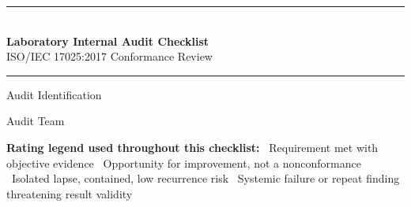 \begin{center}
{\color{auditnavy}\rule{\linewidth}{1.4pt}}\\[6pt]
{\Huge\bfseries\color{auditnavy} Laboratory Internal Audit Checklist}\\[4pt]
{\large\color{auditteal} ISO/IEC 17025:2017 Conformance Review}\\[6pt]
{\color{auditnavy}\rule{\linewidth}{1.4pt}}
\end{center}

\vspace{0.6em}
\noindent
\begin{minipage}[t]{0.48\linewidth}
\begin{infocard}{Audit Identification}
\end{infocard}
\end{minipage}\hfill
\begin{minipage}[t]{0.48\linewidth}
\begin{infocard}{Audit Team}
\end{infocard}
\end{minipage}
\par

\vspace{0.4em}
\begin{sectionbrief}
\textbf{Rating legend used throughout this checklist:}\quad
\Conforms\ Requirement met with objective evidence \quad
\OFI\ Opportunity for improvement, not a nonconformance \quad
\Minor\ Isolated lapse, contained, low recurrence risk \quad
\Major\ Systemic failure or repeat finding threatening result validity
\end{sectionbrief}
